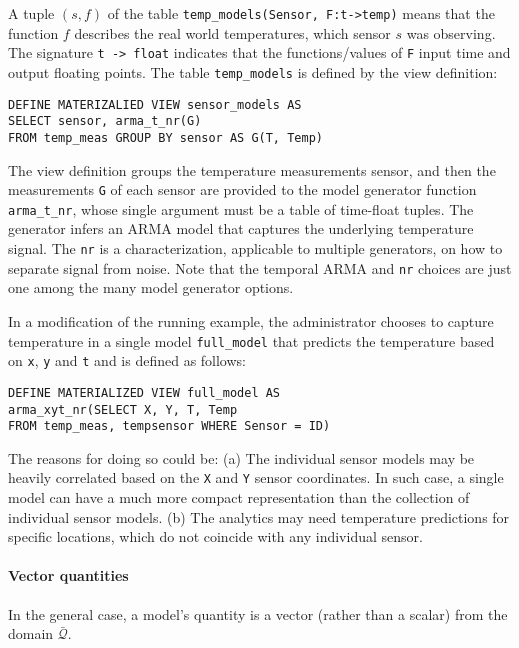 \begin{example}
\label{xmpl:models-and-definitions}
A tuple $(s, f)$ of the table \texttt{temp\_models(Sensor, F:t->temp)} means that the function $f$ describes the real world temperatures, which sensor $s$ was observing. The signature \texttt{t -> float} indicates that the functions/values of \texttt{F} input time and output floating points. The table \texttt{temp\_models} is defined by the view definition:
\begin{verbatim}
DEFINE MATERIZALIED VIEW sensor_models AS 
SELECT sensor, arma_t_nr(G)
FROM temp_meas GROUP BY sensor AS G(T, Temp)
\end{verbatim}
\noindent The view definition groups the temperature measurements sensor, and then the measurements \texttt{G} of each sensor are provided to the model generator function \texttt{arma\_t\_nr}, whose single argument must be a table of time-float tuples. The generator infers an ARMA model that captures the underlying temperature signal. The \texttt{nr} is a characterization, applicable to multiple generators, on how to separate signal from noise. Note that the temporal ARMA and \texttt{nr} choices are just one among the many model generator options.

In a modification of the running example, the administrator chooses to capture temperature in a single model \texttt{full\_model} that predicts the temperature based on \texttt{x}, \texttt{y} and \texttt{t} and is defined as follows:
\begin{verbatim}
DEFINE MATERIALIZED VIEW full_model AS 
arma_xyt_nr(SELECT X, Y, T, Temp
FROM temp_meas, tempsensor WHERE Sensor = ID)
\end{verbatim}
\noindent The reasons for doing so could be: (a) The individual sensor models may be heavily correlated based on the \texttt{X} and \texttt{Y} sensor coordinates. In such case, a single model can have a much more compact representation than the collection of individual sensor models.
(b) The analytics may need temperature predictions for specific locations, which do not coincide with any individual sensor.
\end{example}

\paragraph{Vector quantities} In the general case, a model's quantity is a vector (rather than a scalar) from the domain $\mathcal{\bar{Q}}$.

